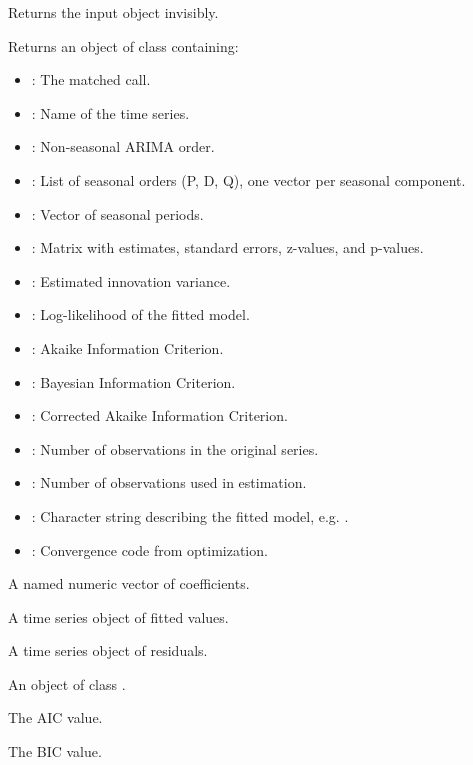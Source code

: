 \documentclass[a4paper]{book}
\begin{document}
\begin{Value}
\begin{description}

\item[] Returns the input object invisibly.
\item[] Returns an object of class  containing:
\begin{itemize}

\item{} : The matched call.
\item{} : Name of the time series.
\item{} : Non-seasonal ARIMA order.
\item{} : List of seasonal orders (P, D, Q), one vector per
seasonal component.
\item{} : Vector of seasonal periods.
\item{} : Matrix with estimates, standard errors, z-values, and p-values.
\item{} : Estimated innovation variance.
\item{} : Log-likelihood of the fitted model.
\item{} : Akaike Information Criterion.
\item{} : Bayesian Information Criterion.
\item{} : Corrected Akaike Information Criterion.
\item{} : Number of observations in the original series.
\item{} : Number of observations used in estimation.
\item{} : Character string describing the fitted model, e.g.
.
\item{} : Convergence code from optimization.

\end{itemize}


\item[] A named numeric vector of coefficients.
\item[] A time series object of fitted values.
\item[] A time series object of residuals.
\item[] An object of class .
\item[] The AIC value.
\item[] The BIC value.

\end{description}

\end{Value}
\end{document}
